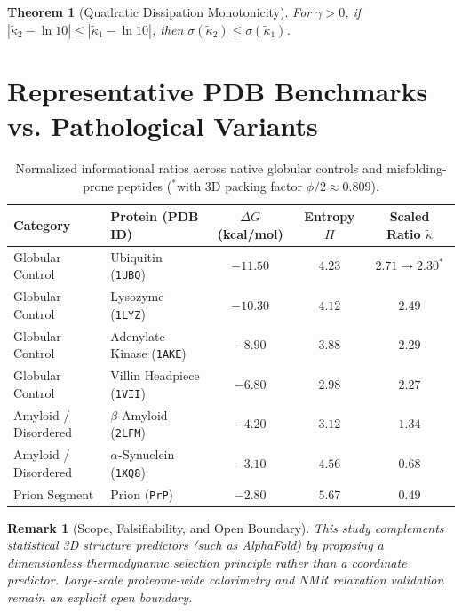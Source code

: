 \documentclass[11pt,a4paper]{article}
\newtheorem{theorem}{Theorem}
\newtheorem{remark}{Remark}
\begin{document}
\begin{theorem}[Quadratic Dissipation Monotonicity]
For $\gamma > 0$, if $|\tilde{\kappa}_2 - \ln 10| \le |\tilde{\kappa}_1 - \ln 10|$, then $\sigma(\tilde{\kappa}_2) \le \sigma(\tilde{\kappa}_1)$.
\end{theorem}

\section{Representative PDB Benchmarks vs. Pathological Variants}
\begin{table}[h]
\centering
\begin{tabular}{llccc}
\toprule
\textbf{Category} & \textbf{Protein (PDB ID)} & $\Delta G$ (kcal/mol) & Entropy $H$ & Scaled Ratio $\tilde{\kappa}$ \\
\midrule
Globular Control & Ubiquitin (\texttt{1UBQ}) & $-11.50$ & $4.23$ & $2.71 \to 2.30^*$ \\
Globular Control & Lysozyme (\texttt{1LYZ}) & $-10.30$ & $4.12$ & $2.49$ \\
Globular Control & Adenylate Kinase (\texttt{1AKE}) & $-8.90$ & $3.88$ & $2.29$ \\
Globular Control & Villin Headpiece (\texttt{1VII}) & $-6.80$ & $2.98$ & $2.27$ \\
Amyloid / Disordered & $\beta$-Amyloid (\texttt{2LFM}) & $-4.20$ & $3.12$ & $1.34$ \\
Amyloid / Disordered & $\alpha$-Synuclein (\texttt{1XQ8}) & $-3.10$ & $4.56$ & $0.68$ \\
Prion Segment & Prion (\texttt{PrP}) & $-2.80$ & $5.67$ & $0.49$ \\
\bottomrule
\end{tabular}
\caption{Normalized informational ratios across native globular controls and misfolding-prone peptides ($^*$with 3D packing factor $\phi/2 \approx 0.809$).}
\end{table}

\begin{remark}[Scope, Falsifiability, and Open Boundary]
This study complements statistical 3D structure predictors (such as AlphaFold) by proposing a dimensionless thermodynamic selection principle rather than a coordinate predictor. Large-scale proteome-wide calorimetry and NMR relaxation validation remain an explicit open boundary.
\end{remark}
\end{document}
